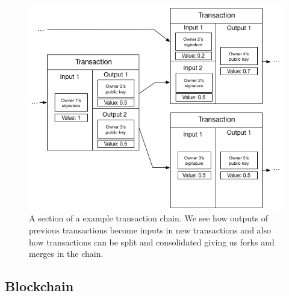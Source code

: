 \begin{figure}[h]  %
  \centering
  \includegraphics[width=.7\textwidth]{figures/transaction}
  \caption[Transaction chain]{A section of a example transaction chain. We see how outputs of previous transactions become inputs in new transactions and also how transactions can be split and consolidated giving us forks and merges in the chain.}
  \label{fig:transaction}
\end{figure}


\subsection{Blockchain}

